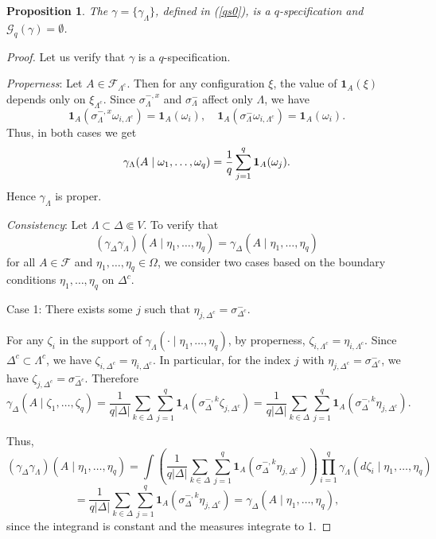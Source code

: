 \documentclass[11pt,reqno]{amsart}
\newtheorem{pro}{Proposition}
\numberwithin{equation}{section} \setcounter{tocdepth}{1}
\begin{document}
\begin{pro} The $\gamma=\{\gamma_\Lambda\}$, defined in (\ref{qs0}), is a $q$-specification and  $\mathcal G_q(\gamma) = \emptyset$.
\end{pro}
\begin{proof}  Let us verify that $\gamma$ is a $q$-specification.

{\it Properness}:
Let $A \in \mathcal{F}_{\Lambda^c}$. Then for any configuration $\xi$, the value of $\mathbf{1}_A(\xi)$ depends only on $\xi_{\Lambda^c}$. Since $\sigma_\Lambda^{-,x}$ and $\sigma^-_\Lambda$ affect only $\Lambda$, we have
$$
\mathbf{1}_A(\sigma_\Lambda^{-,x} \omega_{i,\Lambda^c}) = \mathbf{1}_A(\omega_i), \quad
\mathbf{1}_A(\sigma^-_\Lambda \omega_{i,\Lambda^c}) = \mathbf{1}_A(\omega_i).
$$
Thus, in both cases we get
$$
\gamma_\Lambda(A \mid \omega_1, \dots, \omega_q) = {1\over q}\sum_{j=1}^q \mathbf{1}_A(\omega_j).
$$
Hence $\gamma_\Lambda$ is proper.

{\it Consistency}: Let $\Lambda \subset \Delta \Subset V$. To verify that
$$
(\gamma_\Delta \gamma_\Lambda)(A \mid \eta_1, \dots, \eta_q) = \gamma_\Delta(A \mid \eta_1, \dots, \eta_q)
$$
for all $A \in \mathcal{F}$ and $\eta_1, \dots, \eta_q \in \Omega$, we consider two cases based on the boundary conditions $\eta_1, \dots, \eta_q$ on $\Delta^c$.

Case 1: There exists some $j$ such that $\eta_{j,\Delta^c} = \sigma^-_{\Delta^c}$.

For any $\zeta_i$ in the support of $\gamma_\Lambda(\cdot \mid \eta_1, \dots, \eta_q)$, by properness, $\zeta_{i,\Lambda^c} = \eta_{i,\Lambda^c}$. Since $\Delta^c \subset \Lambda^c$, we have $\zeta_{i,\Delta^c} = \eta_{i,\Delta^c}$. In particular, for the index $j$ with $\eta_{j,\Delta^c} = \sigma^-_{\Delta^c}$, we have $\zeta_{j,\Delta^c} = \sigma^-_{\Delta^c}$. Therefore
$$
\gamma_\Delta(A \mid \zeta_1, \dots, \zeta_q) = \frac{1}{q|\Delta|} \sum_{k \in \Delta} \sum_{j=1}^q \mathbf{1}_A(\sigma_\Delta^{-,k} \zeta_{j,\Delta^c}) = \frac{1}{q|\Delta|} \sum_{k \in \Delta} \sum_{j=1}^q \mathbf{1}_A(\sigma_\Delta^{-,k} \eta_{j,\Delta^c}).
$$

Thus,
$$
(\gamma_\Delta \gamma_\Lambda)(A \mid \eta_1, \dots, \eta_q) = \int \left( \frac{1}{q|\Delta|} \sum_{k \in \Delta} \sum_{j=1}^q \mathbf{1}_A(\sigma_\Delta^{-,k} \eta_{j,\Delta^c}) \right) \prod_{i=1}^q \gamma_\Lambda(d\zeta_i \mid \eta_1, \dots, \eta_q) 
$$ $$= \frac{1}{q|\Delta|} \sum_{k \in \Delta} \sum_{j=1}^q \mathbf{1}_A(\sigma_\Delta^{-,k} \eta_{j,\Delta^c})=\gamma_\Delta(A \mid \eta_1, \dots, \eta_q),
$$
since the integrand is constant and the measures integrate to 1. 


\end{proof}
\end{document}
